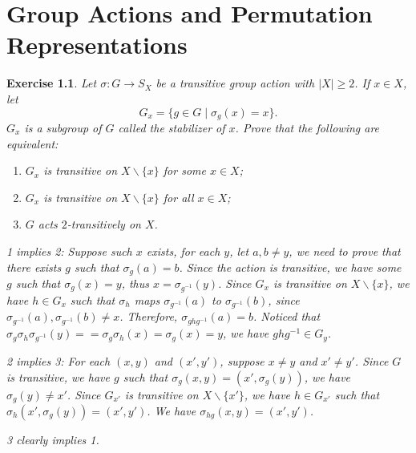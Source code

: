 \documentclass[11pt]{report}
\theoremstyle{mythm}
\let\oldendproof\endproof
\renewenvironment{proof}[1][\proofname]{%
  \oldproof[\normalfont \bfseries #1]%
}{\oldendproof}
\newtheorem{exercise}{Exercise}[chapter]
\renewcommand*{\proofname}{Proof}
\theoremstyle{myans}
\begin{document}
\setcounter{chapter}{6}
\chapter{Group Actions and Permutation Representations}

\setcounter{exercise}{1}
\begin{exercise}
  Let $\sigma\colon G \to S_X$ be a transitive group action with $|X| \geq 2$.
  If $x \in X$, let
  \[ G_x = \{ g\in G \mid \sigma_g(x) = x \}. \]
  $G_x$ is a subgroup of $G$ called the \emph{stabilizer} of $x$. Prove that the following are
  equivalent:
  \begin{enumerate}
    \item $G_x$ is transitive on $X\smallsetminus \{x\}$ for \emph{some} $x\in X$;
    \item $G_x$ is transitive on $X\smallsetminus \{x\}$ for \emph{all} $x\in X$;
    \item $G$ acts $2$-transitively on $X$.
  \end{enumerate}
  \begin{proof}
    1 implies 2: Suppose such $x$ exists, for each $y$, let $a, b \neq y$,
    we need to prove that there exists $g$ such that $\sigma_g(a) = b$.
    Since the action is transitive, we have some $g$ such that $\sigma_g(x) = y$,
    thus $x = \sigma_{g^{-1}}(y)$. Since $G_x$ is transitive on $X \smallsetminus \{x\}$,
    we have $h\in G_x$ such that $\sigma_h$ maps $\sigma_{g^{-1}}(a)$ to $\sigma_{g^{-1}}(b)$,
    since $\sigma_{g^{-1}}(a), \sigma_{g^{-1}}(b) \neq x$. Therefore, 
    $\sigma_{ghg^{-1}}(a) = b$. Noticed that $\sigma_g \sigma_h \sigma_{g^{-1}}(y) = 
    = \sigma_g \sigma_h(x) = \sigma_g(x) = y$, we have $ghg^{-1} \in G_y$.

    2 implies 3: For each $(x, y)$ and $(x', y')$, suppose $x\neq y$ and $x'\neq y'$. Since $G$
    is transitive, we have $g$ such that $\sigma_g(x, y) = (x', \sigma_g(y))$, we have $\sigma_g(y) \neq x'$.
    Since $G_{x'}$ is transitive on $X\smallsetminus \{x'\}$, we have $h\in G_{x'}$ such that
    $\sigma_h(x', \sigma_g(y)) = (x', y')$. We have $\sigma_{hg}(x, y) = (x', y')$.

    3 clearly implies 1.
  \end{proof}
\end{exercise}
\end{document}
